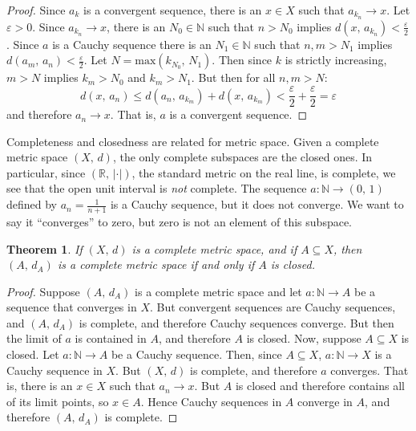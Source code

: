 \documentclass{article}
\theoremstyle{plain}
\newtheorem{theorem}{Theorem}[section]
\begin{document}
        \begin{proof}
            Since $a_{k}$ is a convergent sequence, there is an
            $x\in{X}$ such that $a_{k_{n}}\rightarrow{x}$. Let
            $\varepsilon>0$. Since $a_{k_{n}}\rightarrow{x}$, there is an
            $N_{0}\in\mathbb{N}$ such that $n>N_{0}$ implies
            $d(x,\,a_{k_{n}})<\frac{\varepsilon}{2}$. Since $a$ is a Cauchy
            sequence there is an $N_{1}\in\mathbb{N}$ such that
            $n,m>N_{1}$ implies $d(a_{m},\,a_{n})<\frac{\varepsilon}{2}$.
            Let $N=\textrm{max}(k_{N_{0}},\,N_{1})$.
            Then since $k$ is strictly increasing,
            $m>N$ implies $k_{m}>N_{0}$ and $k_{m}>N_{1}$.
            But then for all $n,m>N$:
            \begin{equation}
                d(x,\,a_{n})\leq{d}(a_{n},\,a_{k_{m}})+d(x,\,a_{k_{m}})
                    <\frac{\varepsilon}{2}+\frac{\varepsilon}{2}=\varepsilon
            \end{equation}
            and therefore $a_{n}\rightarrow{x}$. That is, $a$ is a convergent
            sequence.
        \end{proof}
        Completeness and closedness are related for metric space. Given a
        complete metric space $(X,\,d)$, the only complete subspaces are the
        closed ones. In particular, since $(\mathbb{R},\,|\cdot|)$, the standard
        metric on the real line, is complete, we see that the open unit interval
        is \textit{not} complete. The sequence
        $a:\mathbb{N}\rightarrow(0,\,1)$ defined by $a_{n}=\frac{1}{n+1}$
        is a Cauchy sequence, but it does not converge. We want to say it
        ``converges'' to zero, but zero is not an element of this subspace.
        \begin{theorem}
            If $(X,\,d)$ is a complete metric space, and if
            $A\subseteq{X}$, then $(A,\,d_{A})$ is a complete metric space if
            and only if $A$ is closed.
        \end{theorem}
        \begin{proof}
            Suppose $(A,\,d_{A})$ is a complete metric space and let
            $a:\mathbb{N}\rightarrow{A}$ be a sequence that converges in $X$.
            But convergent sequences are Cauchy sequences, and $(A,\,d_{A})$ is
            complete, and therefore Cauchy sequences converge. But then the
            limit of $a$ is contained in $A$, and therefore $A$ is closed.
            Now, suppose $A\subseteq{X}$ is closed. Let
            $a:\mathbb{N}\rightarrow{A}$ be a Cauchy sequence. Then, since
            $A\subseteq{X}$, $a:\mathbb{N}\rightarrow{X}$ is a Cauchy sequence
            in $X$. But $(X,\,d)$ is complete, and therefore $a$ converges.
            That is, there is an $x\in{X}$ such that $a_{n}\rightarrow{x}$.
            But $A$ is closed and therefore contains all of its limit points,
            so $x\in{A}$. Hence Cauchy sequences in $A$ converge in $A$, and
            therefore $(A,\,d_{A})$ is complete.
        \end{proof}
\end{document}
